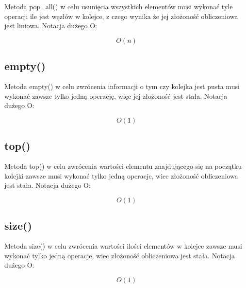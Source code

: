 \documentclass[12pt]{article}
\begin{document}
\begin{multicols}{2}
Metoda pop\_all() w celu usunięcia wszystkich elementów musi wykonać tyle operacji ile jest węzłów w kolejce,
z czego wynika że jej złożoność obliczeniowa jest liniowa. Notacja dużego O:

{\Large \begin{equation*}
    O(n)
\end{equation*} }


\subsection{empty()}

\begin{figure}[H]
    \centering
    
\end{figure}

Metoda empty() w celu zwrócenia informacji o tym czy kolejka jest pusta musi wykonać zawsze 
tylko jedną operację, więc jej złożoność jest stała. Notacja dużego O:

{\Large \begin{equation*}
    O(1)
\end{equation*} }

\subsection{top()}

\begin{figure}[H]
    \centering
    
\end{figure}

Metoda top() w celu zwrócenia wartości elementu znajdującego się na początku kolejki zawsze musi wykonać tylko jedną operacje,
wiec złożoność obliczeniowa jest stała. Notacja dużego O:

{\Large \begin{equation*}
    O(1)
\end{equation*} }

\subsection{size()}
\begin{figure}[H]
    \centering
    
\end{figure}

Metoda size() w celu zwrócenia wartości ilości elementów w kolejce zawsze musi wykonać tylko jedną operacje,
wiec złożoność obliczeniowa jest stała. Notacja dużego O:

{\Large \begin{equation*}
    O(1)
\end{equation*} }

    
\end{multicols}
\end{document}

